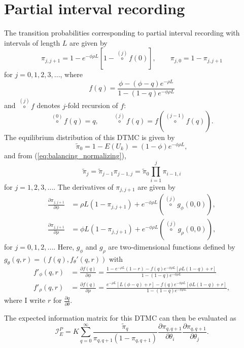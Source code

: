 \documentclass[11pt]{article}
\newcommand{\Info}{\mathcal{I}}
\begin{document}
\section{Partial interval recording}

The transition probabilities corresponding to partial interval recording with intervals of length $L$ are given by 
\begin{equation}
\pi_{j,j+1} = 1 - e^{-\phi \rho L} \left[1 - \stackrel{(j)}{\circ}f \left(0 \right) \right], \qquad \pi_{j,0} = 1 - \pi_{j,j+1}
\end{equation}
for $j = 0,1,2,3,...$, where \[
f(q) = \frac{\phi - \left(\phi - q \right) e^{-\rho L}}{1 - (1 - q) e^{-\phi \rho L}} \]
and $\stackrel{(j)}{\circ}f$ denotes $j$-fold recursion of $f$: \[
\stackrel{(0)}{\circ}f(q) = q, \qquad \stackrel{(j)}{\circ}f(q) = f\left(\stackrel{(j-1)}{\circ}f(q) \right). \]
The equilibrium distribution of this DTMC is given by \[
\tilde{\pi}_0 = 1 - E(U_k) = (1 - \phi) e^{-\phi \rho L}, \]
and from (\ref{eq:balancing_normalizing}), \[
\tilde{\pi}_j = \tilde{\pi}_{j-1} \pi_{j-1,j} = \tilde{\pi}_0 \prod_{i=1}^j \pi_{i-1,i} \]
for $j=1,2,3,...$. The derivatives of $\pi_{j,j+1}$ are given by \begin{align*}
\frac{\partial \pi_{j,j+1}}{\partial \phi} &= \rho L \left(1 - \pi_{j,j+1}\right) +  e^{-\phi \rho L} \left(\stackrel{(j)}{\circ}g_\phi(0,0) \right), \\
\frac{\partial \pi_{j,j+1}}{\partial \rho} &= \phi L \left(1 - \pi_{j,j+1}\right) +  e^{-\phi \rho L} \left(\stackrel{(j)}{\circ}g_\rho(0,0) \right), 
\end{align*}
for $j = 0,1,2,...$. Here, $g_\phi$ and $g_\rho$ are two-dimensional functions defined by $g_\theta(q,r) = \left(f(q), f_\theta'(q,r) \right)$ with \begin{align*}
f'_{\phi}(q,r) &= \frac{\partial f(q)}{\partial \phi} = \frac{1 - e^{-\rho L}\left(1 - r \right) - f(q) e^{-\phi \rho L} \left[\rho L(1 - q) + r \right]}{1 - (1 - q) e^{-\phi \rho L}} \\
f'_{\rho}(q,r) &= \frac{\partial f(q)}{\partial \rho} = \frac{e^{-\rho L}\left[L(\phi - q) + r\right] - f(q) e^{-\phi \rho L} \left[\phi L(1 - q) + r \right]}{1 - (1 - q) e^{-\phi \rho L}},
\end{align*}
where I write $r$ for $\frac{\partial q}{\partial \theta}$. 

The expected information matrix for this DTMC can then be evaluated as
\begin{equation}
\Info_E^P = K \sum_{q=0}^\infty \frac{\tilde{\pi}_q}{\pi_{q,q+1}(1 - \pi_{q,q+1})} \frac{\partial \pi_{q,q+1}}{\partial \theta_i}  \frac{\partial \pi_{q,q+1}}{\partial \theta_j}.
\end{equation}
\end{document}
